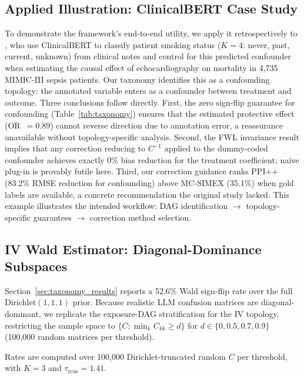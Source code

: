 \subsection{Applied Illustration: ClinicalBERT Case Study}
\label{app:case_study}

To demonstrate the framework's end-to-end utility, we apply it retrospectively to \citet{lee_wood_doughty2024}, who use ClinicalBERT to classify patient smoking status ($K{=}4$: never, past, current, unknown) from clinical notes and control for this predicted confounder when estimating the causal effect of echocardiography on mortality in 4{,}735 MIMIC-III sepsis patients.
Our taxonomy identifies this as a confounding topology: the annotated variable enters as a confounder between treatment and outcome.
Three conclusions follow directly.
First, the zero sign-flip guarantee for confounding (Table~\ref{tab:taxonomy}) ensures that the estimated protective effect (OR~$= 0.89$) cannot reverse direction due to annotation error, a reassurance unavailable without topology-specific analysis.
Second, the FWL invariance result implies that any correction reducing to $C^{-1}$ applied to the dummy-coded confounder achieves exactly 0\% bias reduction for the treatment coefficient; naive plug-in is provably futile here.
Third, our correction guidance ranks PPI++ (83.2\% RMSE reduction for confounding) above MC-SIMEX (35.1\%) when gold labels are available, a concrete recommendation the original study lacked.
This example illustrates the intended workflow: DAG identification $\to$ topology-specific guarantees $\to$ correction method selection.

\subsection{IV Wald Estimator: Diagonal-Dominance Subspaces}
\label{sec:iv_dirichlet_subspace}

Section~\ref{sec:taxonomy_results} reports a 52.6\% Wald sign-flip rate
over the full Dirichlet$(1,1,1)$ prior. Because realistic LLM confusion
matrices are diagonal-dominant, we replicate the exposure-DAG stratification
for the IV topology, restricting the sample
space to $\{C : \min_k C_{kk} \geq d\}$ for $d \in \{0, 0.5, 0.7, 0.9\}$
(100{,}000 random matrices per threshold).

Rates are computed over 100{,}000 Dirichlet-truncated random $C$ per threshold, with $K{=}3$ and $\tau_{\text{true}}{=}1.41$.

